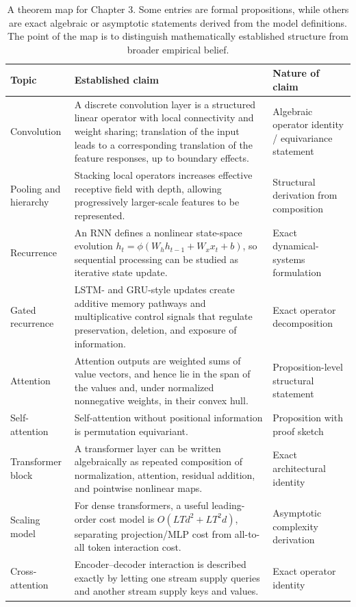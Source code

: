 \begin{table}[h]
\centering
\renewcommand{\arraystretch}{1.25}
\begin{tabular}{|p{2.3cm}|p{5.6cm}|p{4.1cm}|}
\hline
\textbf{Topic} & \textbf{Established claim} & \textbf{Nature of claim} \\
\hline
Convolution & A discrete convolution layer is a structured linear operator with local connectivity and weight sharing; translation of the input leads to a corresponding translation of the feature responses, up to boundary effects. & Algebraic operator identity / equivariance statement \\
\hline
Pooling and hierarchy & Stacking local operators increases effective receptive field with depth, allowing progressively larger-scale features to be represented. & Structural derivation from composition \\
\hline
Recurrence & An RNN defines a nonlinear state-space evolution
\(h_t = \phi(W_h h_{t-1}+W_x x_t+b)\), so sequential processing can be studied as iterative state update. & Exact dynamical-systems formulation \\
\hline
Gated recurrence & LSTM- and GRU-style updates create additive memory pathways and multiplicative control signals that regulate preservation, deletion, and exposure of information. & Exact operator decomposition \\
\hline
Attention & Attention outputs are weighted sums of value vectors, and hence lie in the span of the values and, under normalized nonnegative weights, in their convex hull. & Proposition-level structural statement \\
\hline
Self-attention & Self-attention without positional information is permutation equivariant. & Proposition with proof sketch \\
\hline
Transformer block & A transformer layer can be written algebraically as repeated composition of normalization, attention, residual addition, and pointwise nonlinear maps. & Exact architectural identity \\
\hline
Scaling model & For dense transformers, a useful leading-order cost model is
\(O(LTd^2 + LT^2 d)\), separating projection/MLP cost from all-to-all token interaction cost. & Asymptotic complexity derivation \\
\hline
Cross-attention & Encoder--decoder interaction is described exactly by letting one stream supply queries and another stream supply keys and values. & Exact operator identity \\
\hline
\end{tabular}
\caption{A theorem map for Chapter 3. Some entries are formal propositions, while others are exact algebraic or asymptotic statements derived from the model definitions. The point of the map is to distinguish mathematically established structure from broader empirical belief.}
\label{tab:chapter3theoremmap}
\end{table}

